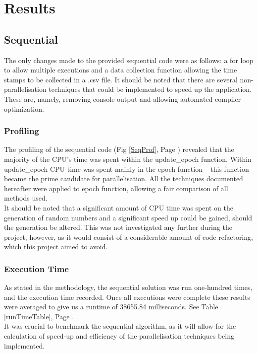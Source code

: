 \documentclass[journal,transmag]{IEEEtran}
\begin{document}
\section{Results}
	\subsection{Sequential}
		The only changes made to the provided sequential code were as follows: a for loop to allow multiple executions and a data collection function allowing the time stamps to be collected in a .csv file. It should be noted that there are several non-parallelisation techniques that could be implemented to speed up the application. These are, namely, removing console output and allowing automated compiler optimization.
	
		\subsubsection{Profiling}
			The profiling of the sequential code (Fig \ref{SeqProf}, Page \pageref{SeqProf}) revealed that the majority of the CPU’s time was spent within the update\_epoch function. Within update\_epoch CPU time was spent mainly in the epoch function – this function became the prime candidate for parallelisation. All the techniques documented hereafter were applied to epoch function, allowing a fair comparison of all methods used.\\
			It should be noted that a significant amount of CPU time was spent on the generation of random numbers and a significant speed up could be gained, should the generation be altered. This was not investigated any further during the project, however, as it would consist of a considerable amount of code refactoring, which this project aimed to avoid.
		
		\subsubsection{Execution Time}
			As stated in the methodology, the sequential solution was run one-hundred times, and the execution time recorded. Once all executions were complete these results were averaged to give us a runtime of 38655.84 milliseconds. See Table \ref{runTimeTable}, Page \pageref{runTimeTable}.\\
			It was crucial to benchmark the sequential algorithm, as it will allow for the calculation of speed-up and efficiency of the parallelisation techniques being implemented.
			
\end{document}
